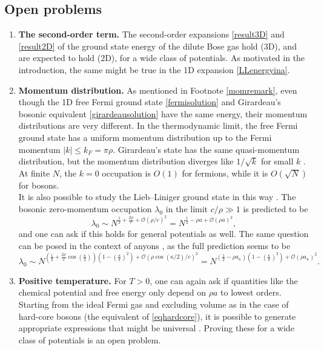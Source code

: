 \documentclass[a4paper,11pt]{article}
\numberwithin{equation}{section}
\begin{document}
\subsection{Open problems}
\label{SecOpenproblems}
\begin{enumerate}
\item \textbf{The second-order term.}
The second-order expansions \eqref{result3D} and \eqref{result2D} of the ground state energy of the dilute Bose gas hold (3D), and are expected to hold (2D), for a wide class of potentials. As motivated in the introduction, the same might be true in the 1D expansion \eqref{LLenergyina}. 

\item \textbf{Momentum distribution.}
As mentioned in Footnote \ref{momremark}, even though the 1D free Fermi ground state \eqref{fermisolution} and Girardeau's bosonic equivalent \eqref{girardeausolution} have the same energy, their momentum distributions are very different. In the thermodynamic limit, the free Fermi ground state has a uniform momentum distribution up to the Fermi momentum $|k|\leq k_F=\pi\rho$. Girardeau's state has the same quasi-momentum distribution, but the momentum distribution diverges like $1/\sqrt{k}$ for small $k$ \cite{lenard1964momentum,vaidya1979one}. At finite $N$, the $k=0$ occupation is $O(1)$ for fermions, while it is $O(\sqrt{N})$ for bosons.\\
It is also possible to study the Lieb--Liniger ground state in this way \cite{colcelli2018deviations}. The bosonic zero-momentum occupation $\lambda_0$ in the limit $c/\rho\gg1$ is predicted to be 
\begin{equation}
\lambda_0\sim N^{\frac12+\frac{2\rho}{c}+\mathcal{O}(\rho/c)^2}=N^{\frac12-\rho a+\mathcal{O}(\rho a)^2}, 
\end{equation}
and one can ask if this holds for general potentials as well. The same question can be posed in the context of anyons \cite{colcelli2018deviations}, as the full prediction seems to be \cite{colcelli2018deviations,batchelor2006one}
\begin{equation}
\lambda_0\sim N^{\left(\frac12+\frac{2\rho}{c}\cos\left(\frac{\kappa}{2}\right)\right)\left(1-\left(\frac{\kappa}{\pi}\right)^2\right)+\mathcal{O}(\rho \cos(\kappa/2)/c)^2}=N^{\left(\frac12-\rho a_\kappa\right)\left(1-\left(\frac{\kappa}{\pi}\right)^2\right)+\mathcal{O}(\rho a_\kappa)^2}.
\end{equation}
\item \textbf{Positive temperature.} For $T>0$, one can again ask if quantities like the chemical potential and free energy only depend on $\rho a$ to lowest orders. Starting from the ideal Fermi gas and excluding volume as in the case of hard-core bosons (the equivalent of \eqref{eqhardcore}), it is possible to generate appropriate expressions that might be universal \cite{de2019beyond}. Proving these for a wide class of potentials is an open problem. 
\end{enumerate}
	
\end{document}
